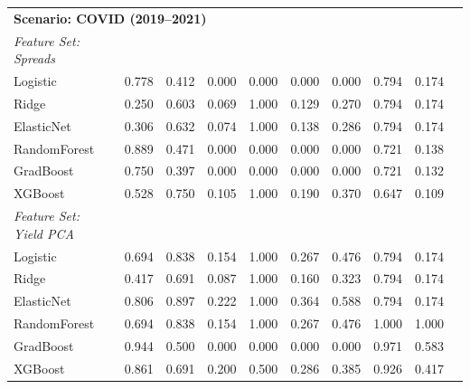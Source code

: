 \begin{longtable}{lccccccccc}
\midrule
\multicolumn{9}{l}{\textbf{Scenario: COVID (2019--2021)}} \\
\textit{Feature Set: Spreads} \\
\midrule
Logistic     & 0.778 & 0.412 & 0.000 & 0.000 & 0.000 & 0.000 & 0.794 & 0.174 \\
Ridge        & 0.250 & 0.603 & 0.069 & 1.000 & 0.129 & 0.270 & 0.794 & 0.174 \\
ElasticNet   & 0.306 & 0.632 & 0.074 & 1.000 & 0.138 & 0.286 & 0.794 & 0.174 \\
RandomForest & 0.889 & 0.471 & 0.000 & 0.000 & 0.000 & 0.000 & 0.721 & 0.138 \\
GradBoost    & 0.750 & 0.397 & 0.000 & 0.000 & 0.000 & 0.000 & 0.721 & 0.132 \\
XGBoost      & 0.528 & 0.750 & 0.105 & 1.000 & 0.190 & 0.370 & 0.647 & 0.109 \\
\addlinespace
\textit{Feature Set: Yield PCA} \\
\midrule
Logistic     & 0.694 & 0.838 & 0.154 & 1.000 & 0.267 & 0.476 & 0.794 & 0.174 \\
Ridge        & 0.417 & 0.691 & 0.087 & 1.000 & 0.160 & 0.323 & 0.794 & 0.174 \\
ElasticNet   & 0.806 & 0.897 & 0.222 & 1.000 & 0.364 & 0.588 & 0.794 & 0.174 \\
RandomForest & 0.694 & 0.838 & 0.154 & 1.000 & 0.267 & 0.476 & 1.000 & 1.000 \\
GradBoost    & 0.944 & 0.500 & 0.000 & 0.000 & 0.000 & 0.000 & 0.971 & 0.583 \\
XGBoost      & 0.861 & 0.691 & 0.200 & 0.500 & 0.286 & 0.385 & 0.926 & 0.417 \\
\end{longtable}